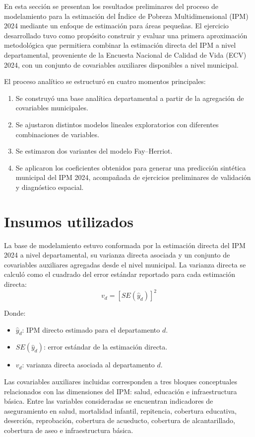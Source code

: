 
En esta sección se presentan los resultados preliminares del proceso de modelamiento para la estimación del Índice de Pobreza Multidimensional (IPM) 2024 mediante un enfoque de estimación para áreas pequeñas. El ejercicio desarrollado tuvo como propósito construir y evaluar una primera aproximación metodológica que permitiera combinar la estimación directa del IPM a nivel departamental, proveniente de la Encuesta Nacional de Calidad de Vida (ECV) 2024, con un conjunto de covariables auxiliares disponibles a nivel municipal.

El proceso analítico se estructuró en cuatro momentos principales:
\begin{enumerate}
    \item Se construyó una base analítica departamental a partir de la agregación de covariables municipales.
    \item Se ajustaron distintos modelos lineales exploratorios con diferentes combinaciones de variables.
    \item Se estimaron dos variantes del modelo Fay–Herriot.
    \item Se aplicaron los coeficientes obtenidos para generar una predicción sintética municipal del IPM 2024, acompañada de ejercicios preliminares de validación y diagnóstico espacial.
\end{enumerate}

\section{Insumos utilizados}
La base de modelamiento estuvo conformada por la estimación directa del IPM 2024 a nivel departamental, su varianza directa asociada y un conjunto de covariables auxiliares agregadas desde el nivel municipal. La varianza directa se calculó como el cuadrado del error estándar reportado para cada estimación directa:
\begin{equation}
v_d = [SE(\hat{y}_d)]^2
\end{equation}

Donde:
\begin{itemize}
    \item $\hat{y}_d$: IPM directo estimado para el departamento $d$.
    \item $SE(\hat{y}_d)$: error estándar de la estimación directa.
    \item $v_d$: varianza directa asociada al departamento $d$.
\end{itemize}

Las covariables auxiliares incluidas corresponden a tres bloques conceptuales relacionados con las dimensiones del IPM: salud, educación e infraestructura básica. Entre las variables consideradas se encuentran indicadores de aseguramiento en salud, mortalidad infantil, repitencia, cobertura educativa, deserción, reprobación, cobertura de acueducto, cobertura de alcantarillado, cobertura de aseo e infraestructura básica.

